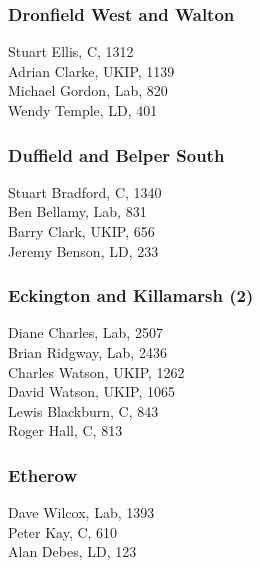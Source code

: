 \documentclass[a4paper,openany,10pt]{book}
\begin{document}
\subsubsection*{Dronfield West and Walton}



Stuart Ellis, C, 1312\\
Adrian Clarke, UKIP, 1139\\
Michael Gordon, Lab, 820\\
Wendy Temple, LD, 401\\


\subsubsection*{Duffield and Belper South}



Stuart Bradford, C, 1340\\
Ben Bellamy, Lab, 831\\
Barry Clark, UKIP, 656\\
Jeremy Benson, LD, 233\\


\subsubsection*{Eckington and Killamarsh (2)}



Diane Charles, Lab, 2507\\
Brian Ridgway, Lab, 2436\\
Charles Watson, UKIP, 1262\\
David Watson, UKIP, 1065\\
Lewis Blackburn, C, 843\\
Roger Hall, C, 813\\


\subsubsection*{Etherow}



Dave Wilcox, Lab, 1393\\
Peter Kay, C, 610\\
Alan Debes, LD, 123\\
\end{document}

